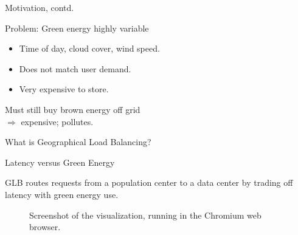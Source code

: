 \documentclass[xcolor=dvipsnames]{beamer}
\begin{document}
\begin{frame}{Motivation, contd.}

	\begin{block}{Problem: Green energy highly variable} 
		\begin{itemize}
			 \item{Time of day, cloud cover, wind speed.}
			 \item{Does not match user demand. }
			\item{Very expensive to store.}
		\end{itemize}
		Must still buy brown energy off grid \\ $\Rightarrow$ expensive; pollutes.
	\end{block}
\end{frame}

\begin{frame}{What is Geographical Load Balancing?}   
\begin{block}{Latency versus Green Energy}

GLB routes requests from a population center to a data center by trading off latency with green energy use. 

\end{block}
\vspace{-7mm}
\begin{figure}
\centering
{}
\caption{Screenshot of the visualization, running in the Chromium web browser.}
\end{figure}

\end{frame}
\end{document}
